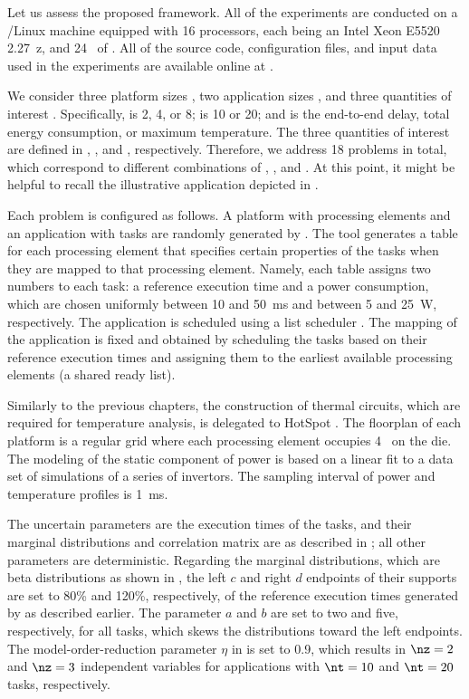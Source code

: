 Let us assess the proposed framework. All of the experiments are conducted on a
/Linux machine equipped with 16 processors, each being an Intel Xeon
E5520 2.27~z, and 24~ of . All of the source code,
configuration files, and input data used in the experiments are available online
at \cite{eslab2017a}.

We consider three platform sizes \np, two application sizes \nt, and three
quantities of interest \g. Specifically, \np is 2, 4, or 8; \nt is 10 or 20; and
\g is the end-to-end delay, total energy consumption, or maximum temperature.
The three quantities of interest are defined in ,
, and , respectively. Therefore, we
address 18 problems in total, which correspond to different combinations of \np,
\nt, and \g. At this point, it might be helpful to recall the illustrative
application depicted in .

Each problem is configured as follows. A platform with \np processing elements
and an application with \nt tasks are randomly generated by 
\cite{dick1998}. The tool generates a table for each processing element that
specifies certain properties of the tasks when they are mapped to that
processing element. Namely, each table assigns two numbers to each task: a
reference execution time and a power consumption, which are chosen uniformly
between 10 and 50~ms and between 5 and 25~W, respectively. The application is
scheduled using a list scheduler \cite{adam1974}. The mapping of the application
is fixed and obtained by scheduling the tasks based on their reference execution
times and assigning them to the earliest available processing elements (a shared
ready list).

Similarly to the previous chapters, the construction of thermal 
circuits, which are required for temperature analysis, is delegated to HotSpot
\cite{skadron2003}. The floorplan of each platform is a regular grid where each
processing element occupies 4~ on the die. The modeling of the
static component of power is based on a linear fit to a data set of 
simulations of a series of  invertors. The sampling interval \dt of
power and temperature profiles is 1~ms.

The uncertain parameters \vu are the execution times of the tasks, and their
marginal distributions and correlation matrix are as described in
; all other parameters are deterministic.
Regarding the marginal distributions, which are beta distributions as shown in
, the left $c$ and right $d$ endpoints of their supports
are set to 80\% and 120\%, respectively, of the reference execution times
generated by  as described earlier. The parameter $a$ and $b$ are set
to two and five, respectively, for all tasks, which skews the distributions
toward the left endpoints. The model-order-reduction parameter $\eta$ in
 is set to 0.9, which results in $\nz = 2$ and $\nz
= 3$ independent variables for applications with $\nt = 10$ and $\nt = 20$
tasks, respectively.

